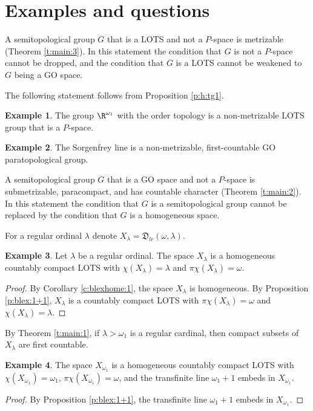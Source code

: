 \documentclass[preprint]{elsarticle}
\def\om{\omega}
\def\la{\lambda}
\theoremstyle{definition}
\newtheorem{example}{Example}
\theoremstyle{remark}
\def\lex#1#2{\mathfrak{L}(#2^{#1})}
\def\lex#1#2{#2^{#1}}
\def\homg#1,#2#3{\mathfrak{D}_{#1}(#2,#3)}
\begin{document}
\section{Examples and questions} \label{sec:qe}

A semitopological group $G$ that is a LOTS and not a $P$-space is metrizable (Theorem \ref{t:main:3}). In this statement the condition that $G$ is not a $P$-space cannot be dropped, and the condition that $G$ is a LOTS cannot be weakened to $G$ being a GO space.

The following statement follows from Proposition \ref{p:h:tg1}.
\begin{example}\label{e:1}
The group $\lex{\om_1}\R$ with the order topology is a non-metrizable LOTS group that is a $P$-space.
\end{example}

\begin{example}\label{e:2}
The Sorgenfrey line is a non-metrizable, first-countable GO paratopological group.
\end{example}

A semitopological group $G$ that is a GO space and not a $P$-space is submetrizable, paracompact, and has countable character (Theorem \ref{t:main:2}). In this statement the condition that $G$ is a semitopological group cannot be replaced by the condition that $G$ is a homogeneous space.

For a regular ordinal $\la$ denote $X_\la=\homg lr,\om\la$.

\begin{example}\label{e:3}
Let $\la$ be a regular ordinal.
The space $X_\la$ is a homogeneous countably compact LOTS with $\chi(X_\la)=\la$ and $\pi\chi(X_\la)=\om$.
\end{example}
\begin{proof}
By Corollary \ref{c:blexhome:1}, the space $X_\la$ is homogeneous. By Proposition \ref{p:blex:1+1}, $X_\la$ is a countably compact LOTS with $\pi\chi(X_\la)=\om$ and $\chi(X_\la)=\la$.
\end{proof}

By Theorem \ref{t:main:1}, if $\la>\om_1$ is a regular cardinal, then compact subsets of $X_\la$ are first countable.

\begin{example}\label{e:4}
The space $X_{\om_1}$ is a homogeneous countably compact LOTS with $\chi(X_{\om_1})=\om_1$, $\pi\chi(X_{\om_1})=\om$, and the transfinite line $\om_{1}+1$ embeds in $X_{\om_1}$.
\end{example}
\begin{proof}
By Proposition \ref{p:blex:1+1}, the transfinite line $\om_{1}+1$ embeds in $X_{\om_1}$.
\end{proof}
\end{document}
